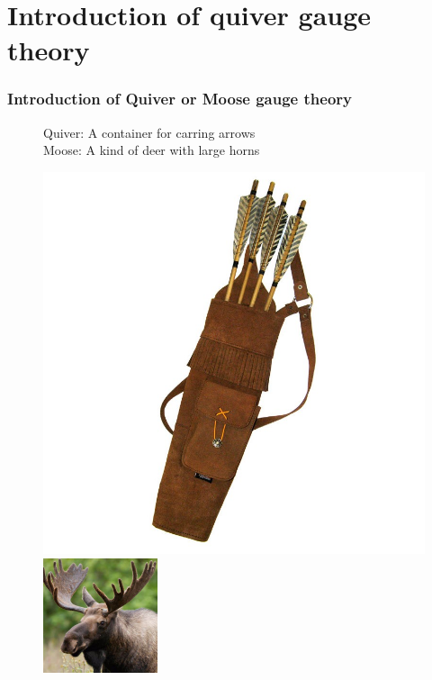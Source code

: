 \documentclass{beamer}
\begin{document}
\section{Introduction of quiver gauge theory}
\begin{frame}
    \frametitle{Introduction of Quiver or Moose gauge theory}
    \begin{figure}
        \centering
        \begin{minipage}{0.45\textwidth}
        Quiver: A container for carring arrows\\
        Moose: A kind of deer with large horns 
    \end{minipage}
    \begin{minipage}{0.45\textwidth}
        \centering
        \includegraphics[width=0.3\linewidth]{Quiver.jpg}
        \hspace{1em}
        \includegraphics[width=0.3\textwidth]{Moose.jpeg}

    \end{minipage}
\end{figure}
    


\end{frame}
\end{document}
